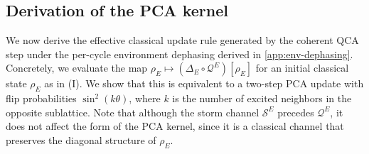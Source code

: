 \documentclass[
    aps,
    prx,
    reprint,
    superscriptaddress,
    longbibliography,
    nofootinbib,
    floatfix,
]{revtex4-2}
\begin{document}
\subsection{Derivation of the PCA kernel}\label{app:pca-kernel}
We now derive the effective classical update rule generated by the coherent QCA step under the per-cycle environment dephasing derived in \cref{app:env-dephasing}. Concretely, we evaluate the map \(\rho_E \mapsto (\Delta_E \circ \mathcal{Q}^E)[\rho_E]\) for an initial classical state \(\rho_E\) as in (I). We show that this is equivalent to a two-step PCA update with flip probabilities \(\sin^2(k\theta)\), where \(k\) is the number of excited neighbors in the opposite sublattice. Note that although the storm channel \(\mathcal{S}^E\) precedes \(\mathcal{Q}^E\), it does not affect the form of the PCA kernel, since it is a classical channel that preserves the diagonal structure of \(\rho_E\).
\end{document}
